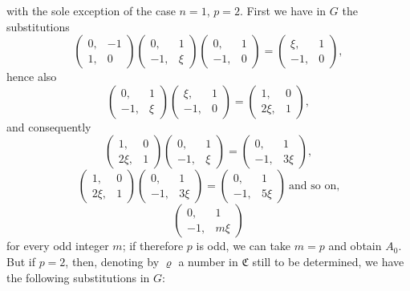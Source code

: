 with the sole exception of the case $n=1$, $p=2$. First we have in $G$ the substitutions
\[
\begin{pmatrix} 0, & -1 \\ 1, & 0 \end{pmatrix}\begin{pmatrix} 0, & 1 \\ -1, & \xi \end{pmatrix}\begin{pmatrix} 0, & 1 \\ -1, & 0 \end{pmatrix} = \begin{pmatrix} \xi, & 1 \\ -1, & 0 \end{pmatrix},
\]
hence also
\[
\begin{pmatrix} 0, & 1 \\ -1, & \xi \end{pmatrix}\begin{pmatrix} \xi, & 1 \\ -1, & 0 \end{pmatrix} = \begin{pmatrix} 1, & 0 \\ 2\xi, & 1 \end{pmatrix},
\]
and consequently
\[
\begin{pmatrix} 1, & 0 \\ 2\xi, & 1 \end{pmatrix}\begin{pmatrix} 0, & 1 \\ -1, & \xi \end{pmatrix} = \begin{pmatrix} 0, & 1 \\ -1, & 3\xi \end{pmatrix},
\]
\[
\begin{pmatrix} 1, & 0 \\ 2\xi, & 1 \end{pmatrix}\begin{pmatrix} 0, & 1 \\ -1, & 3\xi \end{pmatrix} = \begin{pmatrix} 0, & 1 \\ -1, & 5\xi \end{pmatrix} \ \text{and so on,}
\]
\[
\begin{pmatrix} 0, & 1 \\ -1, & m\xi \end{pmatrix}
\]
for every odd integer $m$; if therefore $p$ is odd, we can take $m=p$ and obtain $A_0$. But if $p=2$, then, denoting by $\varrho$ a number in $\mathfrak{C}$ still to be determined, we have the following substitutions in $G$:
